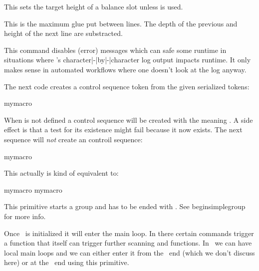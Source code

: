 This sets the target height of a balance slot unless  is used.

\stopnewprimitive

\startoldprimitive[title={\prm {baselineskip}}]

This is the maximum glue put between lines. The depth of the previous and height
of the next line are substracted.

\stopoldprimitive

\startoldprimitive[title={\prm {batchmode}}]

This command disables (error) messages which can safe some runtime in situations
where \TEX's character|-|by|-|character log output impacts runtime. It only makes
sense in automated workflows where one doesn't look at the log anyway.

\stopoldprimitive

\startnewprimitive[title={\prm {begincsname}}]

The next code creates a control sequence token from the given serialized tokens:

\starttyping
\csname mymacro\endcsname
\stoptyping

When \type {\mymacro} is not defined a control sequence will be created with the
meaning . A side effect is that a test for its existence might fail
because it now exists. The next sequence will {\em not} create an controil
sequence:

\starttyping
\begincsname mymacro\endcsname
\stoptyping

This actually is kind of equivalent to:

\starttyping
\ifcsname mymacro\endcsname
    \csname mymacro\endcsname
\fi
\stoptyping

\stopnewprimitive

\startoldprimitive[title={\prm {begingroup}}]

This primitive starts a group and has to be ended with . See \prm
{beginsimplegroup} for more info.

\stopoldprimitive

\startnewprimitive[title={\prm {beginlocalcontrol}}]

Once \TEX\ is initialized it will enter the main loop. In there certain commands
trigger a function that itself can trigger further scanning and functions. In
\LUAMETATEX\ we can have local main loops and we can either enter it from the
\LUA\ end (which we don't discuss here) or at the \TEX\ end using this primitive.

